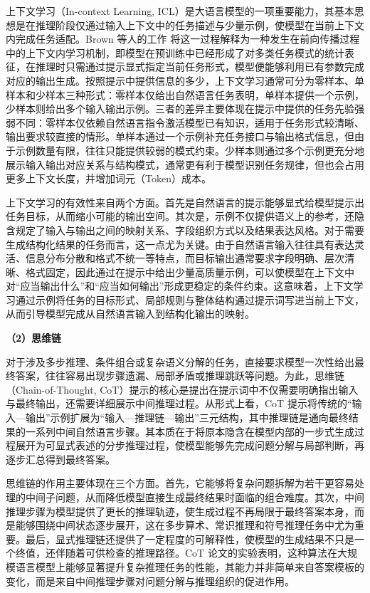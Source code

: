上下文学习（In-context Learning, ICL）是大语言模型的一项重要能力，其基本思想是在推理阶段仅通过输入上下文中的任务描述与少量示例，使模型在当前上下文内完成任务适配。Brown 等人的工作\cite{brown2020gpt3} 将这一过程解释为一种发生在前向传播过程中的上下文内学习机制，即模型在预训练中已经形成了对多类任务模式的统计表征，在推理时只需通过提示显式指定当前任务形式，模型便能够利用已有参数完成对应的输出生成。按照提示中提供信息的多少，上下文学习通常可分为零样本、单样本和少样本三种形式：零样本仅给出自然语言任务表明，单样本提供一个示例，少样本则给出多个输入输出示例。三者的差异主要体现在提示中提供的任务先验强弱不同：零样本仅依赖自然语言指令激活模型已有知识，适用于任务形式较清晰、输出要求较直接的情形。单样本通过一个示例补充任务接口与输出格式信息，但由于示例数量有限，往往只能提供较弱的模式约束。少样本则通过多个示例更充分地展示输入输出对应关系与结构模式，通常更有利于模型识别任务规律，但也会占用更多上下文长度，并增加词元（Token）成本。

上下文学习的有效性来自两个方面。首先是自然语言的提示能够显式给模型提示出任务目标，从而缩小可能的输出空间。其次是，示例不仅提供语义上的参考，还隐含规定了输入与输出之间的映射关系、字段组织方式以及结果表达风格。对于需要生成结构化结果的任务而言，这一点尤为关键。由于自然语言输入往往具有表达灵活、信息分布分散和格式不统一等特点，而目标输出通常要求字段明确、层次清晰、格式固定，因此通过在提示中给出少量高质量示例，可以使模型在上下文中对“应当输出什么”和“应当如何输出”形成更稳定的条件约束。这意味着，上下文学习通过示例将任务的目标形式、局部规则与整体结构通过提示词写进当前上下文，从而引导模型完成从自然语言输入到结构化输出的映射。


\noindent\textbf{（2）思维链}

对于涉及多步推理、条件组合或复杂语义分解的任务，直接要求模型一次性给出最终答案，往往容易出现步骤遗漏、局部矛盾或推理跳跃等问题。为此，思维链（Chain-of-Thought\cite{wei2022chainofthought}, CoT）提示的核心是提出在提示词中不仅需要明确指出输入与最终输出，还需要详细展示中间推理过程。从形式上看，CoT 提示将传统的“输入—输出”示例扩展为“输入—推理链—输出”三元结构，其中推理链是通向最终结果的一系列中间自然语言步骤。其本质在于将原本隐含在模型内部的一步式生成过程展开为可显式表述的分步推理过程，使模型能够先完成问题分解与局部判断，再逐步汇总得到最终答案。

思维链的作用主要体现在三个方面。首先，它能够将复杂问题拆解为若干更容易处理的中间子问题，从而降低模型直接生成最终结果时面临的组合难度。其次，中间推理步骤为模型提供了更长的推理轨迹，使生成过程不再局限于最终答案本身，而是能够围绕中间状态逐步展开，这在多步算术、常识推理和符号推理任务中尤为重要。最后，显式推理链还提供了一定程度的可解释性，使模型的生成结果不只是一个终值，还伴随着可供检查的推理路径。CoT 论文的实验表明，这种算法在大规模语言模型上能够显著提升复杂推理任务的性能，其能力并非简单来自答案模板的变化，而是来自中间推理步骤对问题分解与推理组织的促进作用。

